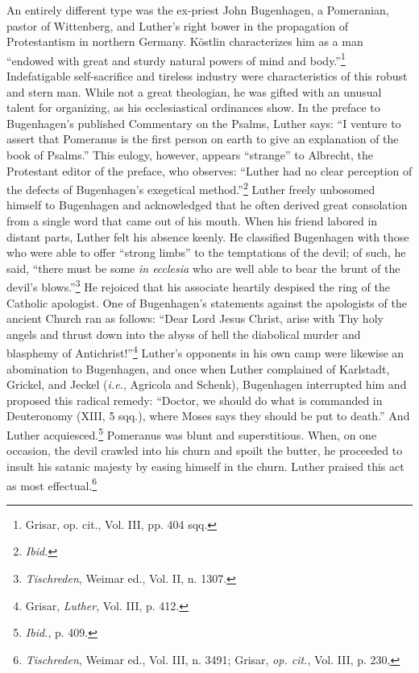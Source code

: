 An entirely different type was the ex-priest John Bugenhagen, a
Pomeranian, pastor of Wittenberg, and Luther’s right bower in the
propagation of Protestantism in northern Germany. Köstlin characterizes
him as a man “endowed with great and sturdy natural powers
of mind and body.”\footnote{Grisar, op. cit., Vol. III, pp. 404 sqq.}
 Indefatigable self-sacrifice and tireless industry
were characteristics of this robust and stern man. While not a great
theologian, he was gifted with an unusual talent for organizing, as
his ecclesiastical ordinances show. In the preface to Bugenhagen’s
published Commentary on the Psalms, Luther says: “I venture to
assert that Pomeranus is the first person on earth to give an explanation
of the book of Psalms.” This eulogy, however, appears “strange”
to Albrecht, the Protestant editor of the preface, who observes:
“Luther had no clear perception of the defects of Bugenhagen’s exegetical
method.”\footnote{\textit{Ibid.}}
 Luther freely unbosomed himself to Bugenhagen
and acknowledged that he often derived great consolation from a
single word that came out of his mouth. When his friend labored in
distant parts, Luther felt his absence keenly. He classified Bugenhagen
with those who were able to offer “strong limbs” to the temptations
of the devil; of such, he said, “there must be some \textit{in ecclesia} who are
well able to bear the brunt of the devil’s blows.”\footnote{\textit{Tischreden}, Weimar ed., Vol. II, n. 1307.}
He rejoiced that
his associate heartily despised the ring of the Catholic apologist. One
of Bugenhagen’s statements against the apologists of the ancient
Church ran as follows: “Dear Lord Jesus Christ, arise with Thy holy
angels and thrust down into the abyss of hell the diabolical murder
and blasphemy of Antichrist!”\footnote{Grisar, \textit{Luther}, Vol. III, p. 412.}
 Luther’s opponents in his own camp
were likewise an abomination to Bugenhagen, and once when Luther
complained of Karlstadt, Grickel, and Jeckel (\textit{i.e.}, Agricola and
Schenk), Bugenhagen interrupted him and proposed this radical
remedy: “Doctor, we should do what is commanded in Deuteronomy
(XIII, 5 sqq.), where Moses says they should be put to death.” And
Luther acquiesced.\footnote{\textit{Ibid.}, p. 409.}
 Pomeranus was blunt and superstitious. When,
on one occasion, the devil crawled into his churn and spoilt the butter,
he proceeded to insult his satanic majesty by easing himself in the
churn. Luther praised this act as most effectual.\footnote
{\textit{Tischreden}, Weimar ed., Vol. III, n. 3491; Grisar, \textit{op. cit.}, Vol. III, p. 230,}

